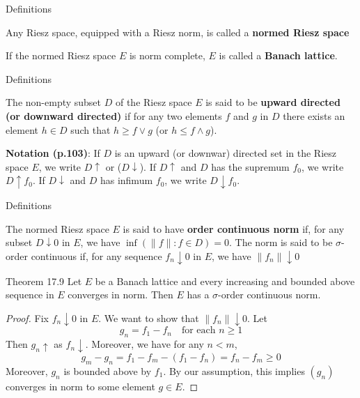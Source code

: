 \documentclass[aspectratio=169]{beamer} %
\begin{document}
\begin{frame}{Definitions}
    \begin{definition}
Any Riesz space, equipped with a Riesz norm, is called a \textbf{normed Riesz space}
\end{definition}
\begin{definition}
If the normed Riesz space $E$ is norm complete, $E$ is called a \textbf{Banach lattice}.
\end{definition}
\end{frame}

\begin{frame}{Definitions}
\begin{definition}
The non-empty subset $D$ of the Riesz space $E$ is said to be \textbf{upward directed (or downward directed)} if for any two elements $f$ and $g$ in $D$ there exists an element $h\in D$ such that $h\ge f\vee g$ (or $h\le f\wedge g$). 
\end{definition}
\textbf{Notation (p.103)}: If $D$ is an upward (or downwar) directed set in the Riesz space $E$, we write $D\uparrow$ or ($D\downarrow$). If $D\uparrow$ and $D$ has the supremum $f_0$, we write $D\uparrow f_0$. If $D\downarrow$ and $D$ has infimum $f_0$, we write $D\downarrow f_0$.
\end{frame}

\begin{frame}{Definitions}
\begin{definition}
The normed Riesz space $E$ is said to have \textbf{order continuous norm} if, for any subset $D\downarrow 0$ in $E$, we have $\inf(\|f\|:f\in D)=0$. The norm is said to be $\sigma$-order continuous if, for any sequence $f_n\downarrow 0$ in $E$, we have $\|f_n\|\downarrow 0$    
\end{definition}
    
\end{frame}

\begin{frame}{Theorem 17.9}
Let $E$ be a Banach lattice and every increasing and bounded above sequence in $E$ converges in norm. Then $E$ has a $\sigma$-order continuous norm.
\begin{proof}
Fix $f_n\downarrow 0$ in $E$. We want to show that $\|f_n\|\downarrow 0$. Let
$$
g_n = f_1-f_n\quad \text{for each $n\ge 1$}
$$
Then $g_n\uparrow$ as $f_n\downarrow$. Moreover, we have for any $n<m$,
$$
g_m-g_n = f_1-f_m-(f_1-f_n)=f_n-f_m\ge 0
$$
Moreover, $g_n$ is bounded above by $f_1$. By our assumption,  this implies $(g_n)$ converges in norm to some element $g\in E$.
\end{proof}
\end{frame}
\end{document}
